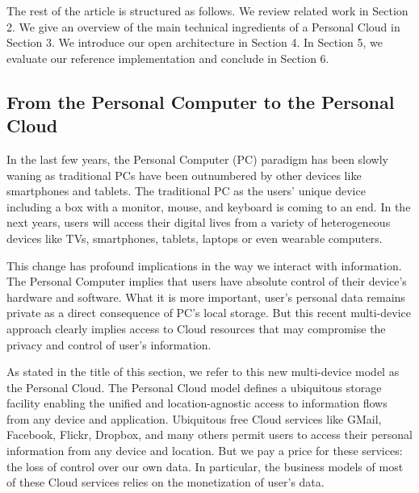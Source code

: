 The rest of the article is structured as follows. We review related work in Section 2. We give an
overview of the main technical ingredients of a Personal Cloud in Section 3. We introduce our 
open architecture in Section 4. In Section 5, we evaluate our reference implementation and conclude
in Section 6.


\subsection{From the Personal Computer to the Personal Cloud}

In the last few years, the Personal Computer (PC) paradigm has been slowly waning as traditional PCs have been outnumbered by other devices like smartphones and tablets. The traditional PC as the users' unique device including a box with a monitor, mouse, and keyboard is coming to an end.  In the next years, users will access their digital lives from a variety of heterogeneous devices like TVs, smartphones, tablets, laptops or even wearable computers.


This change has profound implications in the way we interact with information. The Personal Computer implies that users have absolute control of their device's hardware and software.  What it is more important, user's personal data remains private as a direct consequence of  PC's local storage.  But this recent multi-device approach clearly implies access to Cloud resources that may compromise the privacy and control of user's  information.


As stated in the title of this section, we refer to this new multi-device model as the Personal Cloud. The Personal Cloud model defines a ubiquitous storage facility enabling the unified and location-agnostic access to information flows from any device and application.  Ubiquitous free Cloud services like GMail, Facebook, Flickr, Dropbox, and many others permit users to access their personal information from any device and location.  But we pay a price for these services: the loss of control over our own data. In particular, the business models of most of these Cloud services relies on the monetization of user's data.


